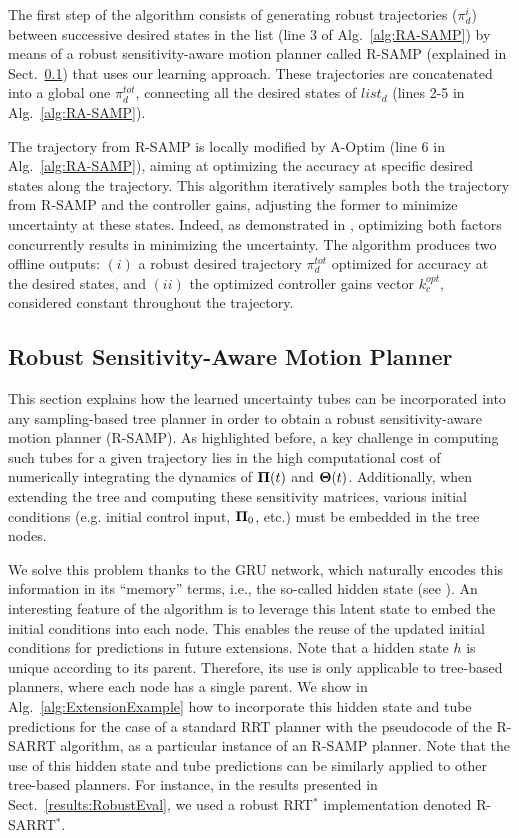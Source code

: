 The first step of the algorithm consists of generating robust trajectories ($\pi_d^i$) between successive desired states in the list (line 3 of Alg.~\ref{alg:RA-SAMP}) by means of a robust sensitivity-aware motion planner called R-SAMP (explained in Sect.~\ref{sec:RSAMP}) that uses our learning approach.
These trajectories are concatenated into a global one $\pi_d^{tot}$, connecting all the desired states of $list_{d}$ (lines 2-5 in Alg.~\ref{alg:RA-SAMP}). 

The trajectory from R-SAMP is locally modified by A-Optim (line 6 in Alg.~\ref{alg:RA-SAMP}), aiming at optimizing the accuracy at specific desired states along the trajectory. 
This algorithm iteratively samples both the trajectory from R-SAMP and the controller gains, adjusting the former to minimize uncertainty at these states. 
Indeed, as demonstrated in \cite{AliIROS}, optimizing both factors concurrently results in minimizing the uncertainty.
The algorithm produces two offline outputs: $(i)$ a robust desired trajectory $\pi_d^{tot}$ optimized for accuracy at the desired states, and $(ii)$ the optimized controller gains vector $k_{c}^{opt}$, considered constant throughout the trajectory.

\subsection{Robust Sensitivity-Aware Motion Planner}\label{sec:RSAMP}

This section explains how the learned uncertainty tubes can be incorporated into any sampling-based tree planner in order to obtain a robust sensitivity-aware motion planner (R-SAMP).
As highlighted before, a key challenge in computing such tubes for a given trajectory lies in the high computational cost of numerically integrating the dynamics of $\boldsymbol{\Pi}(t)$ and $\boldsymbol{\Theta}(t)$.
Additionally, when extending the tree and computing these sensitivity matrices, various initial conditions (e.g. initial control input, $\boldsymbol{\Pi}_0$, etc.) must be embedded in the tree nodes.

We solve this problem thanks to the GRU network, which naturally encodes  this information in its ``memory'' terms, i.e., the so-called hidden state (see \cite{cGRU}).
An interesting feature of the algorithm is to leverage this latent state to embed the initial conditions into each node. This enables the reuse of the updated initial conditions for predictions in future extensions.
Note that a hidden state $h$ is unique according to its parent.
Therefore, its use is only applicable to tree-based planners, where each node has a single parent.
We show in Alg.~\ref{alg:ExtensionExample} how to incorporate this hidden state and tube predictions for the case of a standard RRT planner \cite{cRRT} with the pseudocode of the R-SARRT algorithm, as a particular instance of an R-SAMP planner. 
Note that the use of this hidden state and tube predictions can be similarly applied to other tree-based planners. For instance, in the results presented in Sect.~\ref{results:RobustEval}, we used a robust RRT$^*$ implementation denoted R-SARRT$^*$.

